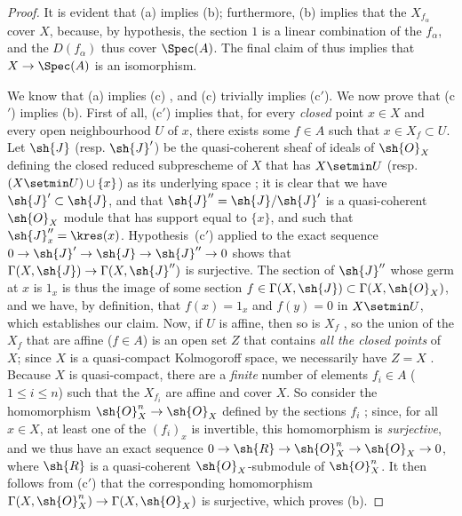 \begin{proof}
It is evident that (a) implies (b); furthermore, (b) implies that the $X_{f_\alpha}$ cover $X$, because, by hypothesis, the section $1$ is a linear combination of the $f_\alpha$, and the $D(f_\alpha)$ thus cover $\Spec(A)$.
The final claim of  thus implies that $X\to\Spec(A)$ is an isomorphism.

We know that (a) implies (c) , and (c) trivially implies (c$'$).
We now prove that (c$'$) implies (b).
First of all, (c$'$) implies that, for every \emph{closed} point $x\in X$ and every open neighbourhood $U$ of $x$, there exists some $f\in A$ such that $x\in X_f\subset U$.
Let $\sh{J}$ (resp. $\sh{J}'$) be the quasi-coherent sheaf of ideals of $\sh{O}_X$ defining the closed reduced subprescheme of $X$ that has $X\setmin U$ (resp. $(X\setmin U)\cup\{x\}$) as its underlying space ;
it is clear that we have $\sh{J}'\subset\sh{J}$, and that $\sh{J}''=\sh{J}/\sh{J}'$ is a quasi-coherent $\sh{O}_X$ module that has support equal to $\{x\}$, and such that $\sh{J}_x''=\kres(x)$.
Hypothesis~(c$'$) applied to the exact sequence $0\to\sh{J}'\to\sh{J}\to\sh{J}''\to0$ shows that $\Gamma(X,\sh{J})\to\Gamma(X,\sh{J}'')$ is surjective.
The section of $\sh{J}''$ whose germ at $x$ is $1_x$ is thus the image of some section $f\in\Gamma(X,\sh{J})\subset\Gamma(X,\sh{O}_X)$, and we have, by definition, that $f(x)=1_x$ and $f(y)=0$ in $X\setmin U$, which establishes our claim.
Now, if $U$ is affine, then so is $X_f$ , so the union of the $X_f$ that are affine ($f\in A$) is an open set $Z$ that contains \emph{all the closed points} of $X$;
since $X$ is a quasi-compact Kolmogoroff space, we necessarily have $Z=X$ .
Because $X$ is quasi-compact, there are a \emph{finite} number of elements $f_i\in A$ ($1\leq i\leq n$) such that the $X_{f_i}$ are affine and cover $X$.
So consider the homomorphism $\sh{O}_X^n\to\sh{O}_X$ defined by the sections $f_i$ ;
since, for all $x\in X$, at least one of the $(f_i)_x$ is invertible, this homomorphism is \emph{surjective}, and we thus have an exact sequence $0\to\sh{R}\to\sh{O}_X^n\to\sh{O}_X\to0$, where $\sh{R}$ is a quasi-coherent $\sh{O}_X$-submodule of $\sh{O}_X^n$.
It then follows
from (c$'$) that the corresponding homomorphism $\Gamma(X,\sh{O}_X^n)\to\Gamma(X,\sh{O}_X)$ is surjective, which proves (b).


\end{proof}
